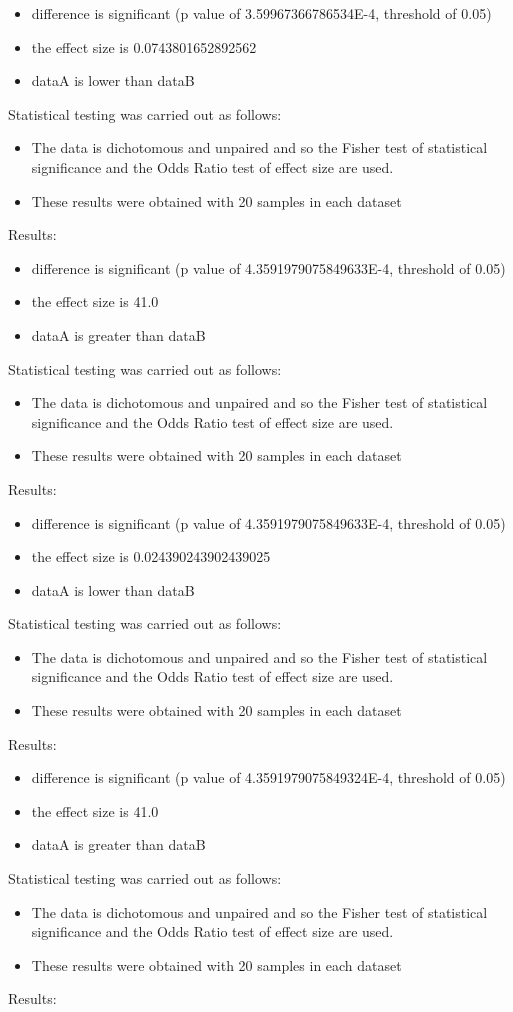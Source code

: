 \documentclass[]{article}
\begin{document}
\begin{itemize}
\item{difference is significant (p value of 3.59967366786534E-4, threshold of 0.05)}
\item{the effect size is 0.0743801652892562}
\item{dataA is lower than dataB}
\end{itemize}Statistical testing was carried out as follows: \begin{itemize}
\item{The data is dichotomous and unpaired and so the Fisher test of statistical significance and the Odds Ratio test of effect size are used.}
\item{These results were obtained with 20 samples in each dataset}
\end{itemize}Results:
\begin{itemize}
\item{difference is significant (p value of 4.3591979075849633E-4, threshold of 0.05)}
\item{the effect size is 41.0}
\item{dataA is greater than dataB}
\end{itemize}Statistical testing was carried out as follows: \begin{itemize}
\item{The data is dichotomous and unpaired and so the Fisher test of statistical significance and the Odds Ratio test of effect size are used.}
\item{These results were obtained with 20 samples in each dataset}
\end{itemize}Results:
\begin{itemize}
\item{difference is significant (p value of 4.3591979075849633E-4, threshold of 0.05)}
\item{the effect size is 0.024390243902439025}
\item{dataA is lower than dataB}
\end{itemize}Statistical testing was carried out as follows: \begin{itemize}
\item{The data is dichotomous and unpaired and so the Fisher test of statistical significance and the Odds Ratio test of effect size are used.}
\item{These results were obtained with 20 samples in each dataset}
\end{itemize}Results:
\begin{itemize}
\item{difference is significant (p value of 4.3591979075849324E-4, threshold of 0.05)}
\item{the effect size is 41.0}
\item{dataA is greater than dataB}
\end{itemize}Statistical testing was carried out as follows: \begin{itemize}
\item{The data is dichotomous and unpaired and so the Fisher test of statistical significance and the Odds Ratio test of effect size are used.}
\item{These results were obtained with 20 samples in each dataset}
\end{itemize}Results:
\end{document}
